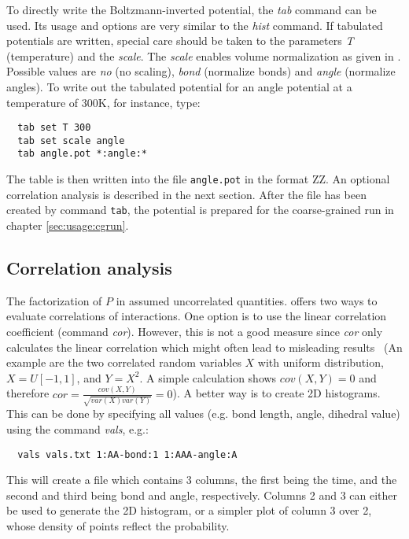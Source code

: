 To directly write the Boltzmann-inverted potential, the \textit{tab} command can be used. Its usage and options are very similar to the \textit{hist} command. If tabulated potentials are written, special care should be taken to the parameters \textit{T} (temperature) and the \textit{scale}. The \textit{scale} enables volume normalization as given in . Possible values are \textit{no} (no scaling), \textit{bond} (normalize bonds) and \textit{angle} (normalize angles). To write out the tabulated potential for an angle potential at a temperature of 300K, for instance, type:
\begin{verbatim}
  tab set T 300
  tab set scale angle
  tab angle.pot *:angle:*
\end{verbatim}
The table is then written into the file \texttt{angle.pot} in the format ZZ. An optional correlation analysis is described in the next section. After the file has been created by command \texttt{tab}, the potential is prepared for the coarse-grained run in chapter \ref{sec:usage:cgrun}.

\subsection{Correlation analysis}
The factorization of $P$ in  assumed uncorrelated quantities.  offers two ways to evaluate correlations of interactions. One option is to use the linear correlation coefficient (command \textit{cor}). However, this is not a good measure since \textit{cor} only calculates the linear correlation which might often lead to misleading results~\cite{Ruehle:2009.a} (An example are the two correlated random variables $X$ with uniform distribution, $X=U[-1,1]$, and $Y=X^2$. A simple calculation shows $cov(X,Y)=0$ and therefore $cor=\frac{cov(X,Y)}{\sqrt{var(X)var(Y)}}=0$). A better way is to create 2D histograms. This can be done by specifying all values (e.g. bond length, angle, dihedral value) using the command \textit{vals}, e.g.:
\begin{verbatim}
  vals vals.txt 1:AA-bond:1 1:AAA-angle:A
\end{verbatim}
This will create a file which contains 3 columns, the first being the time, and the second and third being bond and angle, respectively. Columns 2 and 3 can either be used to generate the 2D histogram, or a simpler plot of column 3 over 2, whose density of points reflect the probability.
